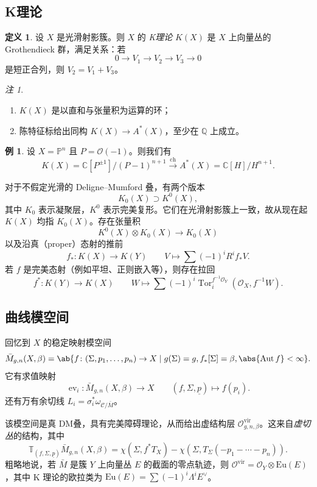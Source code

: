 \documentclass{amsart}
\theoremstyle{definition}
\newtheorem{defn}[thm]{定义}
\newtheorem{exm}[thm]{例}
\theoremstyle{remark}
\newtheorem{rmk}[thm]{注}
\theoremstyle{plain}
\theoremstyle{definition}
\theoremstyle{remark}
\newcommand{\C}{\mathbb{C}}
\newcommand{\Q}{\mathbb{Q}}
\renewcommand{\P}{\mathbb{P}}
\newcommand{\mc}[1]{\mathcal{#1}}
\newcommand{\mr}[1]{\mathrm{#1}}
\newcommand{\on}[1]{\operatorname{#1}}
\newcommand{\ul}[1]{\underline{#1}}
\newcommand{\1}{\mathbf{1}}
\newcommand{\2}{\mathbf{2}}
\newcommand{\3}{\mathbf{3}}
\newcommand{\vir}{\mr{vir}}
\DeclareMathOperator{\Aut}{Aut}
\DeclareMathOperator{\ev}{ev}
\begin{document}
\subsection{K理论}%
\label{sub:K-theory}

\begin{defn}
    设 \(X\) 是光滑射影簇。则 \(X\) 的 \textit{K理论} \(K(X)\) 是 \(X\) 上向量丛的 Grothendieck 群，满足关系：若
    \[ 0 \to V_1 \to V_2 \to V_3 \to 0 \]
    是短正合列，则 \(V_2 = V_1 + V_3\)。
\end{defn}

\begin{rmk}\leavevmode
    \begin{enumerate}
        \item \(K(X)\) 是以直和与张量积为运算的环；
        \item 陈特征标给出同构 \(K(X) \to A^*(X)\)，至少在 \(\Q\) 上成立。
    \end{enumerate}
\end{rmk}

\begin{exm}
    设 \(X = \P^n\) 且 \(P = \mc{O}(-1)\)。则我们有
    \[ K(X) = \C[P^{\pm 1}]/(P-1)^{n+1} \xrightarrow{\on{ch}} A^*(X) = \C[H]/H^{n+1}. \]
\end{exm}

对于不假定光滑的 Deligne--Mumford 叠，有两个版本
\[ K_0(X) \supset K^0(X), \]
其中 \(K_0\) 表示凝聚层，\(K^0\) 表示完美复形。它们在光滑射影簇上一致，故从现在起 \(K(X)\) 均指 \(K_0(X)\)。存在张量积
\[ K^0(X) \otimes K_0(X) \to K_0(X) \]
以及沿真（proper）态射的推前
\[ f_* \colon K(X) \to K(Y) \qquad V \mapsto \sum (-1)^i R^i f_* V. \]
若 \(f\) 是完美态射（例如平坦、正则嵌入等），则存在拉回
\[ f^* \colon K(Y) \to K(X) \qquad W \mapsto \sum (-1)^i \on{Tor}_i^{f^{-1} \mc{O}_Y} (\mc{O}_X, f^{-1} W). \]

\subsection{曲线模空间}%
\label{sub:Moduli of curves}

回忆到 \(X\) 的稳定映射模空间
\[ \bar{M}_{g,n}(X, \beta) = \ab\{ f \colon (\Sigma, p_1, \ldots, p_n) \to X \mid g(\Sigma) = g, f_*[\Sigma] = \beta, \abs{\Aut f} < \infty \}. \]
它有求值映射
\[ \ev_i \colon \bar{M}_{g,n}(X, \beta) \to X \qquad (f, \Sigma, \ul{p}) \mapsto f(p_i). \]
还有万有余切线 \(L_i = \sigma_i^* \omega_{ \mc{C}/\bar{M} }\)。

该模空间是真 DM叠，具有完美障碍理论，从而给出虚结构层 \(\mc{O}^{\vir}_{g,n,\beta}\)。这来自\textit{虚切丛}的结构，其中
\[ \mathbb{T}_{(f, \Sigma, \ul{p})} \bar{M}_{g,n}(X, \beta) = \chi(\Sigma, f^* T_X) - \chi(\Sigma, T_{\Sigma}(-p_1 - \cdots - p_n)). \]
粗略地说，若 \(\bar{M}\) 是簇 \(Y\) 上向量丛 \(E\) 的截面的零点轨迹，则 \(\mc{O}^{\vir} = \mc{O}_Y \otimes \mr{Eu}(E)\)，其中 K 理论的欧拉类为 \(\mr{Eu}(E) = \sum (-1)^i \Lambda^i E^{\vee}\)。
\end{document}
